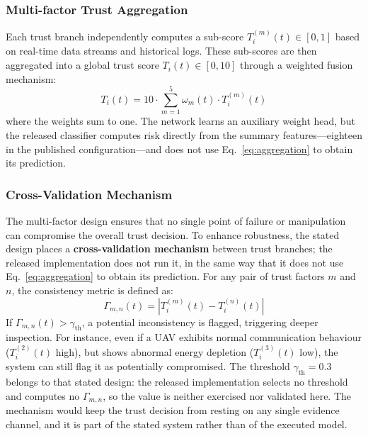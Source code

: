 \documentclass[notspecified,article,submit,moreauthors]{Definitions/mdpi}
\begin{document}
\subsubsection{Multi-factor Trust Aggregation}
\label{sec:multi_factor_aggregation}
Each trust branch independently computes a sub-score $T_i^{(m)}(t) \in [0, 1]$ based on real-time data streams and historical logs. These sub-scores are then aggregated into a global trust score $T_i(t) \in [0, 10]$ through a weighted fusion mechanism:
\begin{equation}\label{eq:aggregation}
T_i(t) = 10 \cdot \sum_{m=1}^{5} \omega_m(t) \cdot T_i^{(m)}(t)
\end{equation}
where the weights sum to one. The network learns an auxiliary weight head, but the released classifier computes risk directly from the summary features---eighteen in the published configuration---and does not use Eq.~\ref{eq:aggregation} to obtain its prediction.

\subsubsection{Cross-Validation Mechanism}
The multi-factor design ensures that no single point of failure or manipulation can compromise the overall trust decision. To enhance robustness, the stated design places a \textbf{cross-validation mechanism} between trust branches; the released implementation does not run it, in the same way that it does not use Eq.~\ref{eq:aggregation} to obtain its prediction. For any pair of trust factors $m$ and $n$, the consistency metric is defined as:
\begin{equation}\label{eq:consistency}
\Gamma_{m,n}(t) = \left| T_i^{(m)}(t) - T_i^{(n)}(t) \right|
\end{equation}
If $\Gamma_{m,n}(t) > \gamma_{\text{th}}$, a potential inconsistency is flagged, triggering deeper inspection. For instance, even if a UAV exhibits normal communication behaviour ($T_i^{(2)}(t)$ high), but shows abnormal energy depletion ($T_i^{(3)}(t)$ low), the system can still flag it as potentially compromised. The threshold $\gamma_{\text{th}} = 0.3$ belongs to that stated design: the released implementation selects no threshold and computes no $\Gamma_{m,n}$, so the value is neither exercised nor validated here. The mechanism would keep the trust decision from resting on any single evidence channel, and it is part of the stated system rather than of the executed model.
\end{document}
